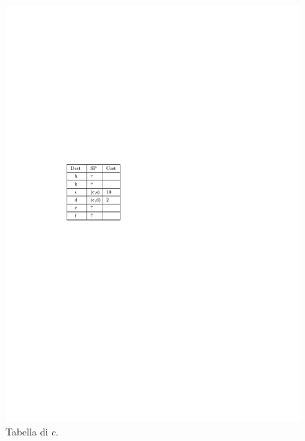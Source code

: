 \documentclass[10pt,xcolor=dvipsnames]{beamer}
\begin{document}
\begin{frame}
\begin{figure}[h]
		\includegraphics[scale=0.7]{routing_table_local_initial_c.pdf}
		\caption*{Tabella di $c$.}
	\end{figure}
\end{frame}
\end{document}
